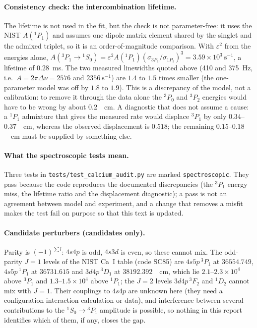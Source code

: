 \paragraph{Consistency check: the intercombination lifetime.} The lifetime is not used in the fit, but the check is not parameter-free: it uses the NIST $A(^1P_1)$ and assumes one dipole matrix element shared by the singlet and the admixed triplet, so it is an order-of-magnitude comparison. With $\varepsilon^2$ from the energies alone, $A(^3P_1\!\to\!{}^1S_0)=\varepsilon^2A(^1P_1)(\sigma_{3P_1}/\sigma_{1P_1})^3=3.59\times10^3\ \mathrm s^{-1}$, a lifetime of $0.28$~ms. The two measured linewidths quoted above (410 and 375~Hz, i.e.\ $A=2\pi\Delta\nu=2576$ and $2356\ \mathrm s^{-1}$) are $1.4$ to $1.5$ times smaller (the one-parameter model was off by $1.8$ to $1.9$). This is a discrepancy of the model, not a calibration: to remove it through the data alone the $^3P_0$ and $^3P_2$ energies would have to be wrong by about $0.2$~\si{\per\centi\metre}. A diagnostic that does not assume a cause: a $^1P_1$ admixture that gives the measured rate would displace $^3P_1$ by only $0.34$--$0.37$~\si{\per\centi\metre}, whereas the observed displacement is $0.518$; the remaining $0.15$--$0.18$~\si{\per\centi\metre} must be supplied by something else.

\paragraph{What the spectroscopic tests mean.} Three tests in \texttt{tests/test\_calcium\_audit.py} are marked \texttt{spectroscopic}. They pass because the code reproduces the documented discrepancies (the $^3P_1$ energy miss, the lifetime ratio and the displacement diagnostic); a pass is not an agreement between model and experiment, and a change that removes a misfit makes the test fail on purpose so that this text is updated.

\paragraph{Candidate perturbers (candidates only).} Parity is $(-1)^{\sum l}$: $4s4p$ is odd, $4s3d$ is even, so these cannot mix. The odd-parity $J=1$ levels of the NIST Ca~I table (code SC85) are $4s5p\,^3P_1$ at $36554.749$, $4s5p\,^1P_1$ at $36731.615$ and $3d4p\,^3D_1$ at $38192.392$~\si{\per\centi\metre}, which lie $2.1$--$2.3\times10^4$ above $^3P_1$ and $1.3$--$1.5\times10^4$ above $^1P_1$; the $J=2$ levels $3d4p\,^3F_2$ and $^1D_2$ cannot mix with $J=1$. Their couplings to $4s4p$ are unknown here (they need a configuration-interaction calculation or data), and interference between several contributions to the $^1S_0\to{}^3P_1$ amplitude is possible, so nothing in this report identifies which of them, if any, closes the gap.

